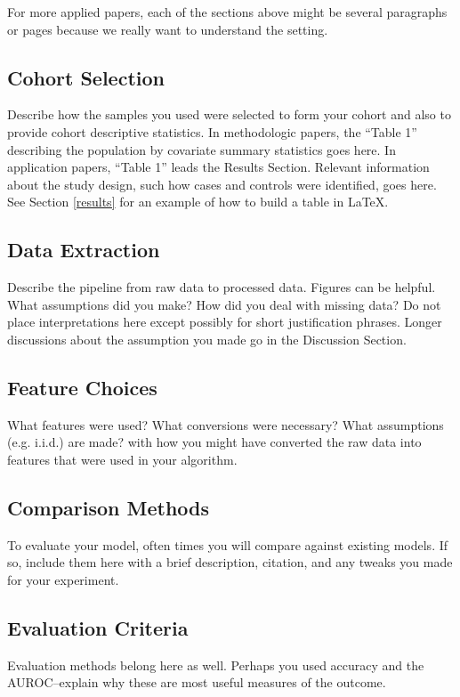 \documentclass[twoside,11pt]{article}
\begin{document}
For more applied papers, each of the sections above might be several paragraphs or pages because we really want to understand the setting.

\subsection{Cohort Selection} 
Describe how the samples you used were selected to form your cohort and also to provide cohort descriptive statistics. In methodologic papers, the ``Table 1'' describing the population by covariate summary statistics goes here. In application papers, ``Table 1'' leads the Results Section. Relevant information about the study design, such how cases and controls were identified, goes here. See Section \ref{results} for an example of how to build a table in LaTeX.

\subsection{Data Extraction} 
Describe the pipeline from raw data to processed data. Figures can be helpful. What assumptions did you make? How did you deal with missing data? Do not place interpretations here except possibly for short justification phrases. Longer discussions about the assumption you made go in the Discussion Section.

\subsection{Feature Choices} 
What features were used? What conversions were necessary? What assumptions (e.g. i.i.d.) are made? with how you might have converted the raw data into features that were used in your algorithm. 

\subsection{Comparison Methods}
To evaluate your model, often times you will compare against existing models.
If so, include them here with a brief description, citation, and any tweaks you made for your experiment.

\subsection{Evaluation Criteria}
Evaluation methods belong here as well.
Perhaps you used accuracy and the AUROC--explain why these are most useful measures of the outcome.
\end{document}
